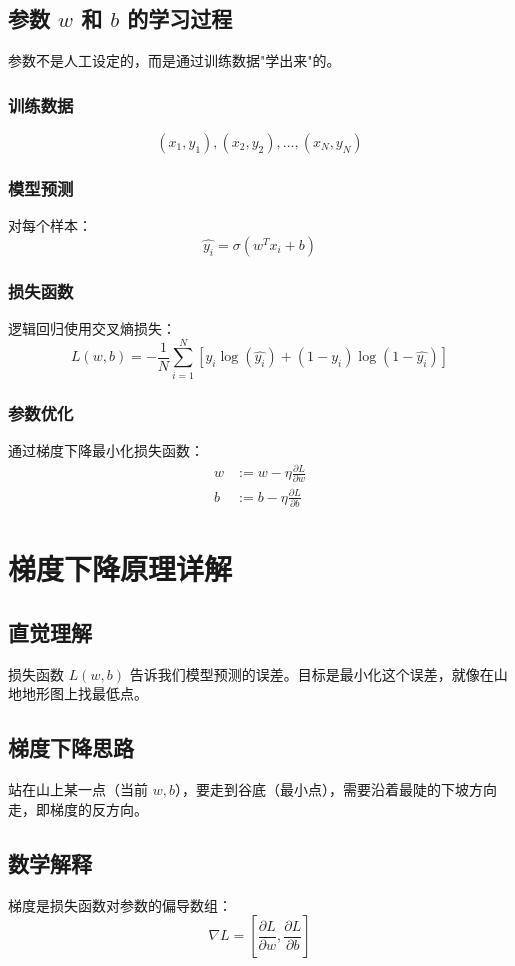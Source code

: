\documentclass[UTF8]{ctexart}
\begin{document}
	\subsection{参数 $w$ 和 $b$ 的学习过程}
	参数不是人工设定的，而是通过训练数据"学出来"的。
	
	\subsubsection{训练数据}
	\[
	(x_1, y_1), (x_2, y_2), \dots, (x_N, y_N)
	\]
	
	\subsubsection{模型预测}
	对每个样本：
	\[
	\hat{y_i} = \sigma(w^T x_i + b)
	\]
	
	\subsubsection{损失函数}
	逻辑回归使用交叉熵损失：
	\[
	L(w, b) = -\frac{1}{N} \sum_{i=1}^{N} [y_i \log(\hat{y_i}) + (1 - y_i) \log(1 - \hat{y_i})]
	\]
	
	\subsubsection{参数优化}
	通过梯度下降最小化损失函数：
	\begin{align}
		w &:= w - \eta \frac{\partial L}{\partial w} \\
		b &:= b - \eta \frac{\partial L}{\partial b}
	\end{align}
	
	\section{梯度下降原理详解}
	
	\subsection{直觉理解}
	损失函数 $L(w, b)$ 告诉我们模型预测的误差。目标是最小化这个误差，就像在山地地形图上找最低点。
	
	\subsection{梯度下降思路}
	站在山上某一点（当前 $w, b$），要走到谷底（最小点），需要沿着最陡的下坡方向走，即梯度的反方向。
	
	\subsection{数学解释}
	梯度是损失函数对参数的偏导数组：
	\[
	\nabla L = \left[\frac{\partial L}{\partial w}, \frac{\partial L}{\partial b}\right]
	\]
	
\end{document}
